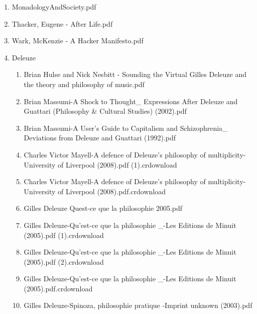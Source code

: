 \documentclass[11pt]{article}
\begin{document}
\begin{enumerate}
\item MonadologyAndSociety.pdf
\label{sec-1-1-1-1-11-29-16}

\item Thacker, Eugene - After Life.pdf
\label{sec-1-1-1-1-11-29-17}

\item Wark, McKenzie - A Hacker Manifesto.pdf
\label{sec-1-1-1-1-11-29-18}

\item Deleuze
\label{sec-1-1-1-1-11-29-19}
\begin{enumerate}
\item Brian Hulse and Nick Nesbitt - Sounding the Virtual Gilles Deleuze and the theory and philosophy of music.pdf
\label{sec-1-1-1-1-11-29-19-1}

\item Brian Massumi-A Shock to Thought\_ Expressions After Deleuze and Guattari (Philosophy \& Cultural Studies) (2002).pdf
\label{sec-1-1-1-1-11-29-19-2}

\item Brian Massumi-A User's Guide to Capitalism and Schizophrenia\_ Deviations from Deleuze and Guattari (1992).pdf
\label{sec-1-1-1-1-11-29-19-3}

\item Charles Victor Mayell-A defence of Deleuze's philosophy of multiplicity-University of Liverpool (2008).pdf (1).crdownload
\label{sec-1-1-1-1-11-29-19-4}

\item Charles Victor Mayell-A defence of Deleuze's philosophy of multiplicity-University of Liverpool (2008).pdf.crdownload
\label{sec-1-1-1-1-11-29-19-5}

\item Gilles Deleuze Quest-ce que la philosophie   2005.pdf
\label{sec-1-1-1-1-11-29-19-6}

\item Gilles Deleuze-Qu'est-ce que la philosophie \_-Les Editions de Minuit (2005).pdf (1).crdownload
\label{sec-1-1-1-1-11-29-19-7}

\item Gilles Deleuze-Qu'est-ce que la philosophie \_-Les Editions de Minuit (2005).pdf (2).crdownload
\label{sec-1-1-1-1-11-29-19-8}

\item Gilles Deleuze-Qu'est-ce que la philosophie \_-Les Editions de Minuit (2005).pdf.crdownload
\label{sec-1-1-1-1-11-29-19-9}

\item Gilles Deleuze-Spinoza, philosophie pratique  -Imprint unknown (2003).pdf
\label{sec-1-1-1-1-11-29-19-10}


\end{enumerate}
\end{enumerate}
\end{document}
